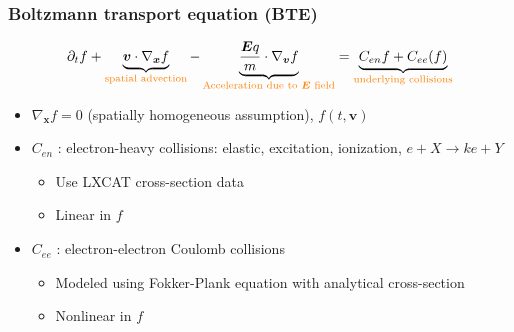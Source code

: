 \documentclass[mathserif, aspectratio=169]{beamer}
\newcommand{\vect}[1]{\boldsymbol{#1}}
\newcommand{\myint}{\int\limits}
\newcommand{\diff}[1]{\, d#1}
\begin{document}
\begin{frame}
	\frametitle{Boltzmann transport equation (BTE)}
	\begin{align}
		\partial_t f  + \underbrace{\vect{v} \cdot \nabla_{\vect{x}} f}_{\textcolor{orange}{\text{spatial advection}}} -\underbrace{\frac{\vect{E} q}{m} \cdot \nabla_{\vect{v }}f}_{\textcolor{orange}{\text{Acceleration due to $\vect{E}$ field}}} = \underbrace{C_{en}f + C_{ee}(f)}_{\textcolor{orange}{\text{underlying collisions}}}
	\end{align}
	\begin{itemize}
		\item $\nabla_{\vect{x}} f =0$ (spatially homogeneous assumption), $f(t, \vect{v})$
		\item $C_{en}$ : electron-heavy collisions: elastic, excitation, ionization, $e + X \rightarrow k e + Y$
		\begin{itemize}
			\item Use LXCAT cross-section data 
			\item Linear in $f$
		\end{itemize} 
		\item $C_{ee}$ : electron-electron Coulomb collisions 
		\begin{itemize}
			\item Modeled using Fokker-Plank equation with analytical cross-section
			\item Nonlinear in $f$
		\end{itemize}
	\end{itemize}
\end{frame}
\end{document}
